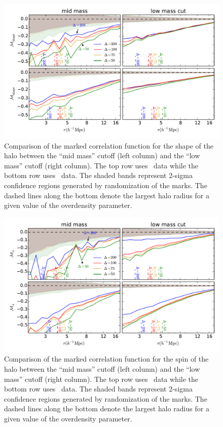 \documentclass[usenatbib,usegraphicx,letterpaper]{mn2e}
\begin{document}
\begin{figure}
	\centering
	\includegraphics[width=.9\textwidth]{all_mcf_s_z00_hostsvlow.pdf}
	\caption{Comparison of the marked correlation function for the shape of the halo between the ``mid mass'' cutoff (left column) and the ``low mass'' cutoff (right column). The top row uses \simA \ data while the bottom row uses \simB \ data. The shaded bands represent 2-sigma confidence regions generated by randomization of the marks. The dashed lines along the bottom denote the largest halo radius for a given value of the overdensity parameter.}
	\label{fig:hvl_mcf_s}
\end{figure}

\begin{figure}
	\centering
	\includegraphics[width=.9\textwidth]{all_mcf_spin_z00_hostsvlow.pdf}
	\caption{Comparison of the marked correlation function for the spin of the halo between the ``mid mass'' cutoff (left column) and the ``low mass'' cutoff (right column). The top row uses \simA \ data while the bottom row uses \simB \ data. The shaded bands represent 2-sigma confidence regions generated by randomization of the marks. The dashed lines along the bottom denote the largest halo radius for a given value of the overdensity parameter.}
	\label{fig:hvl_mcf_spin}
\end{figure}
\end{document}
